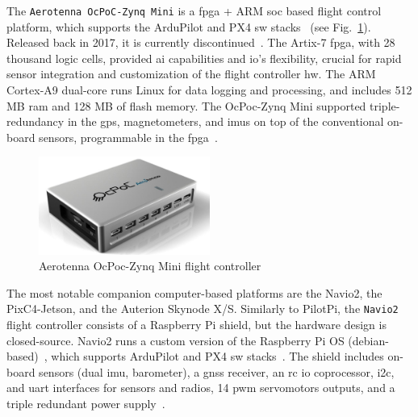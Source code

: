 The \lstinline{Aerotenna OcPoC-Zynq Mini} is a \gls{fpga} + ARM \gls{soc} based
  flight control platform,  which supports the ArduPilot and PX4 \gls{sw}
  stacks~\cite{ocpoc} (see Fig.~\ref{fig:hw-ocpoc}). Released back in 2017, it
  is currently discontinued~\cite{ocpoc-discontinued}.
  The Artix-7 \gls{fpga}, with 28 thousand logic cells, provided \gls{ai}
  capabilities and \gls{io}'s flexibility, crucial for rapid sensor integration
  and customization of the flight controller \gls{hw}. The ARM Cortex-A9
  dual-core runs Linux for data logging and processing, and includes 512 MB
  \gls{ram} and 128 MB of flash memory. The OcPoc-Zynq Mini supported
  triple-redundancy in the \gls{gps}, magnetometers, and \glspl{imu} on top of
  the conventional on-board sensors, programmable in the
  \gls{fpga}~\cite{ocpoc}.

\begin{figure}[!hbt]
  \centering
  \includegraphics[width=0.5\textwidth]{./img/png/hw-ocpoc-zynq-mini.png} 
  \caption[Aerotenna OcPoc-Zynq Mini flight controller]{Aerotenna OcPoc-Zynq Mini flight controller~\cite{ocpoc}\footnotemark}%
  \label{fig:hw-ocpoc}
\end{figure}
%
%

The most notable companion computer-based platforms are the Navio2,
the PixC4-Jetson, and the Auterion Skynode X/S.  
Similarly to PilotPi, the \lstinline{Navio2} flight controller consists of a
Raspberry Pi shield, but the hardware design is closed-source.
Navio2 runs a custom version of the Raspberry Pi OS (debian-based)~\cite{navio2-sw}, which supports ArduPilot and PX4 \gls{sw}
stacks~\cite{arduPilot-Navio2,navio2-px4}.
  The shield includes on-board
  sensors (dual \gls{imu}, barometer), a \gls{gnss} receiver, an \gls{rc}
  \gls{io} coprocessor, \gls{i2c}, and
  \gls{uart} interfaces for sensors and radios, 14 \gls{pwm} servomotors
  outputs, and a triple redundant power supply~\cite{arduPilot-Navio2}.

